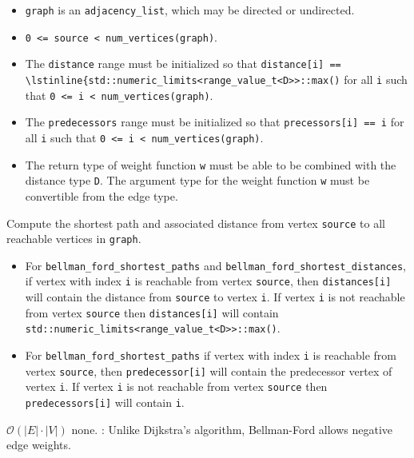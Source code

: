 \begin{itemdescr}
      \pnum\preconditions
      \begin{itemize}
            \item
                  \lstinline{graph} is an \lstinline{adjacency_list}, which may be directed or
                  undirected.
            \item
                  \lstinline{0 <= source < num_vertices(graph)}.
            \item
                  The \lstinline{distance} range must be initialized so that
                  \lstinline{distance[i] ==  \lstinline{std::numeric_limits<range_value_t<D>>::max()}
                  for all \lstinline{i}
                  such that \lstinline{0 <= i < num_vertices(graph)}.  
            \item
                  The \lstinline{predecessors} range must be initialized so that
                  \lstinline{precessors[i] == i} for all \lstinline{i} such that
                  \lstinline{0 <= i < num_vertices(graph)}.
            \item
                  The return type of weight function \lstinline{w} must be able to
                  be combined with the distance type \lstinline{D}.  The argument type for the weight
                  function \lstinline{w} must be convertible from the edge type.
      \end{itemize}
      \pnum
      \effects Compute the shortest path and associated distance from vertex
      \lstinline{source} to all reachable vertices in \lstinline{graph}.
      \pnum\returns
      \begin{itemize}
            \item For \lstinline{bellman_ford_shortest_paths} and \lstinline{bellman_ford_shortest_distances},
                  if vertex with index \lstinline{i} is reachable from vertex \lstinline{source}, then
                  \lstinline{distances[i]} will contain the distance from \lstinline{source} to vertex
                  \lstinline{i}.  If vertex \lstinline{i} is not reachable from vertex
                  \lstinline{source} then \lstinline{distances[i]} will contain
                  \lstinline{std::numeric_limits<range_value_t<D>>::max()}.
            \item
                  For \lstinline{bellman_ford_shortest_paths} if vertex with index \lstinline{i} is reachable
                  from vertex \lstinline{source}, then \lstinline{predecessor[i]} will contain the
                  predecessor vertex of vertex \lstinline{i}.  If vertex \lstinline{i} is not reachable
                  from vertex \lstinline{source} then \lstinline{predecessors[i]} will contain
                  \lstinline{i}.
      \end{itemize}
      \pnum\complexity $\mathcal{O}(|E| \cdot |V|)$ 
      \pnum\throws none. 
      \pnum\remarks:  Unlike Dijkstra's algorithm, Bellman-Ford allows negative edge weights.
\end{itemdescr}


